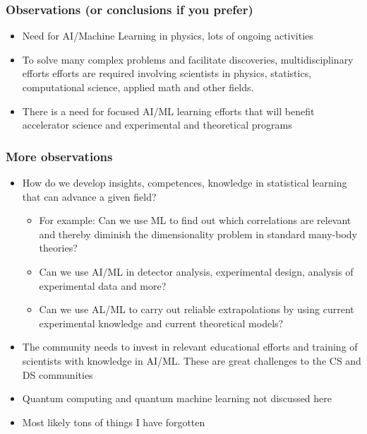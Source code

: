 \documentclass{beamer}
\begin{document}
\begin{frame}
\frametitle{Observations (or conclusions if you prefer)}

\begin{block}{}
\begin{itemize}
\item Need for AI/Machine Learning in physics, lots of ongoing activities

\item To solve many complex problems and facilitate discoveries, multidisciplinary efforts efforts are required involving scientists in  physics, statistics, computational science, applied math and other fields.

\item There is a need for  focused AI/ML learning efforts that will benefit accelerator science and experimental and theoretical programs
\end{itemize}

\noindent
\end{block}
\end{frame}

\begin{frame}
\frametitle{More observations}

\begin{block}{}
\begin{itemize}
\item How do we develop insights, competences, knowledge in statistical learning that can advance a given field?
\begin{itemize}

  \item For example: Can we use ML to find out which correlations are relevant and thereby diminish the dimensionality problem in standard many-body  theories?

  \item Can we use AI/ML in detector analysis, experimental design, analysis of experimental data and more?

  \item Can we use AL/ML to carry out reliable extrapolations by using current experimental knowledge and current theoretical models?

\end{itemize}

\noindent
\item The community needs to invest in relevant educational efforts and training of scientists with knowledge in AI/ML. These are great challenges to the CS and DS communities

\item Quantum computing and quantum machine learning not discussed here

\item Most likely tons of things I have forgotten
\end{itemize}

\noindent
\end{block}
\end{frame}
\end{document}
